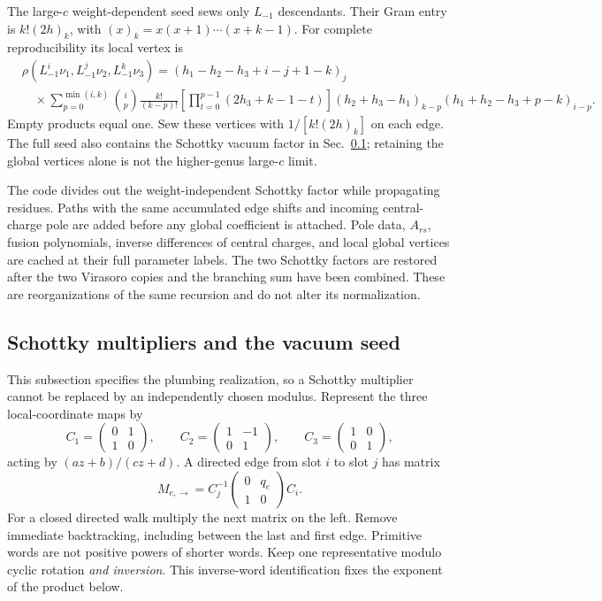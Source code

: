 The large-$c$ weight-dependent seed sews only $L_{-1}$ descendants.
Their Gram entry is $k!(2h)_k$, with $(x)_k=x(x+1)\cdots(x+k-1)$.
For complete reproducibility its local vertex is
\begin{align}
 &\rho(L_{-1}^i\nu_1,L_{-1}^j\nu_2,L_{-1}^k\nu_3)
 =(h_1-h_2-h_3+i-j+1-k)_j\nonumber\\
 &\quad\times\sum_{p=0}^{\min(i,k)}\binom ip
 \frac{k!}{(k-p)!}
 \left[\prod_{t=0}^{p-1}(2h_3+k-1-t)\right]
 (h_2+h_3-h_1)_{k-p}(h_1+h_2-h_3+p-k)_{i-p}.
 \label{eq:app-global-vertex}
\end{align}
Empty products equal one. Sew these vertices with $1/[k!(2h)_k]$
on each edge. The full seed also contains the Schottky vacuum factor
in Sec.~\ref{app:schottky}; retaining the global vertices alone is not
the higher-genus large-$c$ limit.

The code divides out the weight-independent Schottky factor while
propagating residues. Paths with the same accumulated edge shifts and
incoming central-charge pole are added before any global coefficient
is attached. Pole data, $A_{rs}$, fusion polynomials, inverse differences
of central charges, and local global vertices are cached at their full
parameter labels. The two Schottky factors are restored after the two
Virasoro copies and the branching sum have been combined. These are
reorganizations of the same recursion and do not alter its normalization.

\subsection{Schottky multipliers and the vacuum seed}
\label{app:schottky}

This subsection specifies the plumbing realization, so a Schottky
multiplier cannot be replaced by an independently chosen modulus.
Represent the three local-coordinate maps by
\begin{equation}
 C_1=\begin{pmatrix}0&1\\1&0\end{pmatrix},\qquad
 C_2=\begin{pmatrix}1&-1\\0&1\end{pmatrix},\qquad
 C_3=\begin{pmatrix}1&0\\0&1\end{pmatrix},
 \label{eq:app-coordinate-matrices}
\end{equation}
acting by $(az+b)/(cz+d)$. A directed edge from slot $i$ to slot $j$
has matrix
\begin{equation}
 M_{e,\to}=C_j^{-1}\begin{pmatrix}0&q_e\\1&0\end{pmatrix}C_i.
 \label{eq:app-edge-map}
\end{equation}
For a closed directed walk multiply the next matrix on the left.
Remove immediate backtracking, including between the last and first
edge. Primitive words are not positive powers of shorter words.
Keep one representative modulo cyclic rotation \emph{and inversion}.
This inverse-word identification fixes the exponent of the product below.

